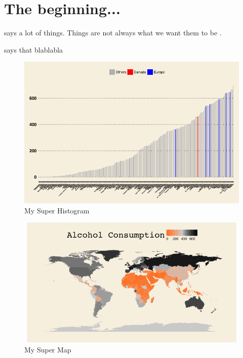 \documentclass{article}
\begin{document}
\section*{The beginning...} 


 says a lot of things. Things are not always what we want them to be \cite{skocpol1999bringing}.

 says that blablabla



\lipsum[1]


\begin{figure}[h!]
  \caption{My Super Histogram}
  \centering
  \includegraphics[width=1\textwidth]{AlcoholConsumptionHistogram}
\end{figure}

\begin{figure}[h!]
  \caption{My Super Map}
  \centering
  \includegraphics[width=1\textwidth]{AlcoholConsumptionMap}
\end{figure}


\lipsum[2]







\end{document}
